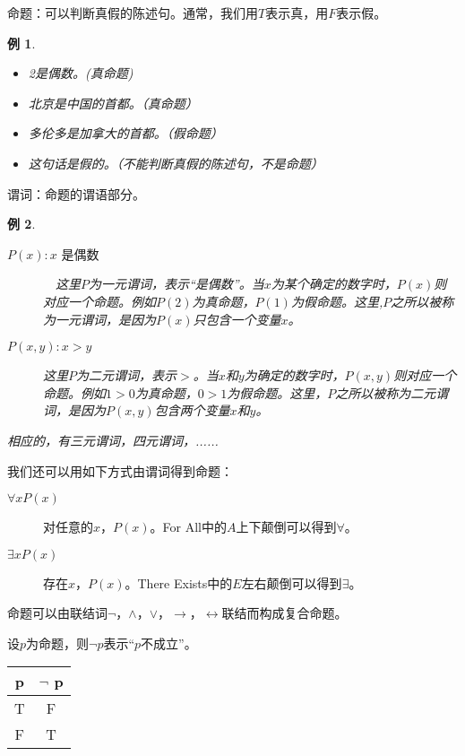 \documentclass{article}
\newtheorem*{Example}{例}
\begin{document}
\begin{CJK}{UTF8}{gbsn}
  命题：可以判断真假的陈述句。通常，我们用$T$表示真，用$F$表示假。
  \begin{Example}\quad
    
    \begin{itemize}
    \item 2是偶数。(真命题)
    \item 北京是中国的首都。（真命题）
    \item 多伦多是加拿大的首都。（假命题）
    \item 这句话是假的。（不能判断真假的陈述句，不是命题）
    \end{itemize}
  \end{Example}
  谓词：命题的谓语部分。
  
  \begin{Example}\quad
    
    \begin{description}
    \item     [$P(x): x$ 是偶数]　这里$P$为一元谓词，表示“是偶数”。当$x$为某个确定的数字时，$P(x)$则对应一个命题。例如$P(2)$为真命题，$P(1)$为假命题。这里,$P$之所以被称为一元谓词，是因为$P(x)$只包含一个变量$x$。
    \item     [$P(x,y): x >y$]  这里$P$为二元谓词，表示$>$。当$x$和$y$为确定的数字时，$P(x,y)$则对应一个命题。例如$1>0$为真命题，$0>1$为假命题。这里，$P$之所以被称为二元谓词，是因为$P(x,y)$包含两个变量$x$和$y$。
    \end{description}
相应的，有三元谓词，四元谓词，......
\end{Example}

我们还可以用如下方式由谓词得到命题：

\begin{description}
\item [$\forall x P(x)$] 对任意的$x$，$P(x)$。For All中的$A$上下颠倒可以得到$\forall$。
\item [$\exists x P(x)$] 存在$x$，$P(x)$。There Exists中的$E$左右颠倒可以得到$\exists$。
\end{description}

命题可以由联结词$\lnot$，$\land$，$\lor$，$\to$，$\leftrightarrow$联结而构成复合命题。

设$p$为命题，则$\lnot p$表示“$p$不成立”。

 \begin{tabular}{c|c}
    p& $\lnot$ p\\
    \hline
    T&F\\
    F&T\\
  \end{tabular}


\end{CJK}
\end{document}
